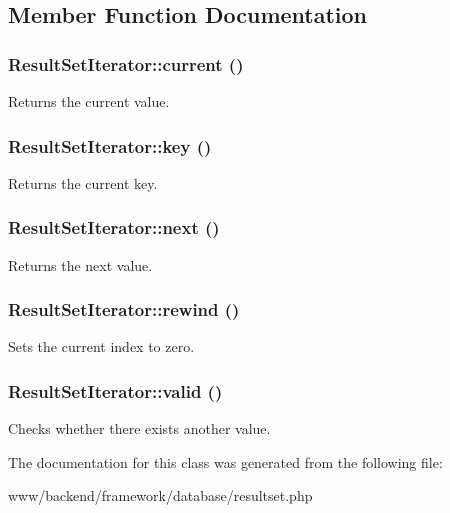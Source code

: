 \subsection{Member Function Documentation}
\hypertarget{classResultSetIterator_a7eb652f50d47244c2f2090ad77cba6c3}{
\subsubsection[{current}]{\setlength{\rightskip}{0pt plus 5cm}ResultSetIterator::current ()}}
\label{classResultSetIterator_a7eb652f50d47244c2f2090ad77cba6c3}
Returns the current value. \hypertarget{classResultSetIterator_a4d31e6ec548912c7f725b9fa71df8b02}{
\subsubsection[{key}]{\setlength{\rightskip}{0pt plus 5cm}ResultSetIterator::key ()}}
\label{classResultSetIterator_a4d31e6ec548912c7f725b9fa71df8b02}
Returns the current key. \hypertarget{classResultSetIterator_a5ed2709915f0e61d008f62ac99f6d7d7}{
\subsubsection[{next}]{\setlength{\rightskip}{0pt plus 5cm}ResultSetIterator::next ()}}
\label{classResultSetIterator_a5ed2709915f0e61d008f62ac99f6d7d7}
Returns the next value. \hypertarget{classResultSetIterator_aa93d51d5866155c4eacea03f8856c54c}{
\subsubsection[{rewind}]{\setlength{\rightskip}{0pt plus 5cm}ResultSetIterator::rewind ()}}
\label{classResultSetIterator_aa93d51d5866155c4eacea03f8856c54c}
Sets the current index to zero. \hypertarget{classResultSetIterator_a1ddc5f382d17bc1fcc2d9740fa2acf2c}{
\subsubsection[{valid}]{\setlength{\rightskip}{0pt plus 5cm}ResultSetIterator::valid ()}}
\label{classResultSetIterator_a1ddc5f382d17bc1fcc2d9740fa2acf2c}
Checks whether there exists another value. 

The documentation for this class was generated from the following file:\begin{DoxyCompactItemize}
\item 
www/backend/framework/database/resultset.php\end{DoxyCompactItemize}
